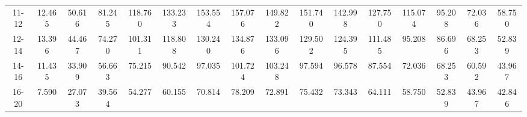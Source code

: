 \documentclass[11pt]{article}
\begin{document}
\begin{table}
\begin{adjustbox}{max width=\textwidth}
\begin{tabular}{c||ccccccccccccccc}
      11-12 & 12.465 & 50.616 & 81.245 & 118.760 & 133.233 & 153.554 & 157.076 & 149.822 & 151.740 & 142.998 & 127.750 & 115.074 & 95.208 & 72.036 & 58.750\\
      12-14 & 13.396 & 44.467 & 74.270 & 101.311 & 118.808 & 130.240 & 134.876 & 133.096 & 129.502 & 124.395 & 111.485 & 95.208 & 86.696 & 68.253 & 52.839\\
      14-16 & 11.435 & 33.909 & 56.663 & 75.215 & 90.542 & 97.035 & 101.724 & 103.248 & 97.594 & 96.578 & 87.554 & 72.036 & 68.253 & 60.592 & 43.967\\
      16-20 & 7.590 & 27.073 & 39.564 & 54.277 & 60.155 & 70.814 & 78.209 & 72.891 & 75.432 & 73.343 & 64.111 & 58.750 & 52.839 & 43.967 & 42.846
    \end{tabular}
  \end{adjustbox}
  \label{tbl:syscov_thetamu_deg_scintillator}
\end{table}
\end{document}
